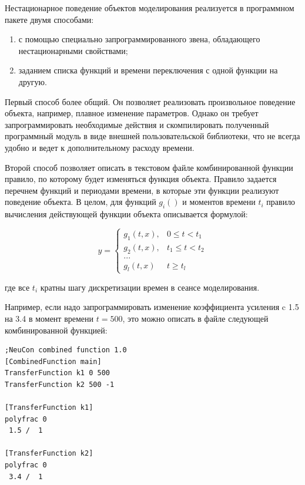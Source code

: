 
Нестационарное поведение объектов моделирования реализуется в
программном пакете двумя способами:
\begin{enumerate}
\item с помощью специально запрограммированного звена, обладающего
  нестационарными свойствами;
\item заданием списка функций и времени переключения с одной функции
  на другую.
\end{enumerate}

Первый способ более общий.  Он позволяет реализовать произвольное
поведение объекта, например, плавное изменение параметров.  Однако он
требует запрограммировать необходимые действия и скомпилировать
полученный программный модуль в виде внешней пользовательской
библиотеки, что не всегда удобно и ведет к дополнительному расходу
времени.

Второй способ позволяет описать в текстовом файле комбинированной
функции правило, по которому будет изменяться функция объекта.
Правило задается перечнем функций и периодами времени, в которые эти
функции реализуют поведение объекта.  В целом, для функций $g_i()$ и
моментов времени $t_i$ правило вычисления действующей функции объекта
описывается формулой:

$$
y=\left\{
\begin{array}{ll}
  g_1(t,x), & 0\le t < t_1\\
  g_2(t,x), & t_1\le t < t_2\\
  ... & \\
  g_l(t,x) & t \ge t_l
\end{array}\right.
$$

\noindent где все $t_i$ кратны шагу дискретизации времен в сеансе
моделирования.

Например, если надо запрограммировать изменение коэффициента усиления
c 1.5 на 3.4 в момент времени $t=500$, это можно описать в файле
следующей комбинированной функцией:

\begin{verbatim}
;NeuCon combined function 1.0
[CombinedFunction main]
TransferFunction k1 0 500
TransferFunction k2 500 -1

[TransferFunction k1]
polyfrac 0
 1.5 /  1

[TransferFunction k2]
polyfrac 0
 3.4 /  1
\end{verbatim}

